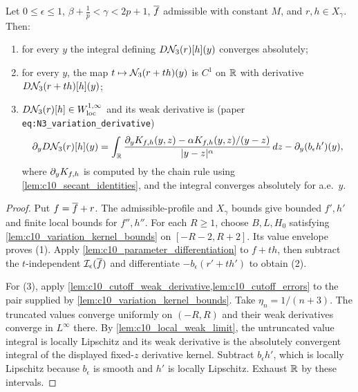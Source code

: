 \begin{lemma}
  \label{lem:c10_N3_variation}
  Let $0\le\epsilon\le1$, $\beta+\frac1p<\gamma<2p+1$, $\overline{f}$ admissible with constant $M$, and
  $r,h\in X_\gamma$. Then:
  \begin{enumerate}
    \item for every $y$ the integral defining $D\mathcal{N}_3(r)[h](y)$ converges absolutely;
    \item for every $y$, the map $t\mapsto\mathcal{N}_3(r+th)(y)$ is $C^1$ on $\mathbb{R}$ with derivative
      $D\mathcal{N}_3(r+th)[h](y)$;
    \item $D\mathcal{N}_3(r)[h]\in W^{1,\infty}_{\mathrm{loc}}$ and its weak derivative is (paper
      \texttt{eq:N3\_variation\_derivative})
      \[
        \partial_yD\mathcal{N}_3(r)[h](y)=\int_{\mathbb{R}}\frac{\partial_yK_{f,h}(y,z)-\alpha K_{f,h}(y,z)/(y-z)}{|y-z|^\alpha}\,dz-\partial_y(b_\epsilon h')(y),
      \]
      where $\partial_yK_{f,h}$ is computed by the chain rule using \cref{lem:c10_secant_identities}, and the
      integral converges absolutely for a.e.\ $y$.
  \end{enumerate}
\end{lemma}
\begin{proof}
  Put $f=\overline{f}+r$. The admissible-profile and $X_\gamma$ bounds give bounded $f',h'$ and finite
  local bounds for $f'',h''$. For each $R\ge1$, choose $B,L,H_0$ satisfying
  \cref{lem:c10_variation_kernel_bounds} on $[-R-2,R+2]$. Its value envelope proves (1).
  Apply \cref{lem:c10_parameter_differentiation} to $f+th$, then subtract the $t$-independent
  $\mathcal{I}_\epsilon(\overline{f})$ and differentiate $-b_\epsilon(r'+th')$ to obtain (2).

  For (3), apply \cref{lem:c10_cutoff_weak_derivative,lem:c10_cutoff_errors} to the pair supplied by
  \cref{lem:c10_variation_kernel_bounds}. Take $\eta_n=1/(n+3)$. The truncated values converge
  uniformly on $(-R,R)$ and their weak derivatives converge in $L^\infty$ there.
  By \cref{lem:c10_local_weak_limit}, the untruncated value integral is locally Lipschitz and its
  weak derivative is the absolutely convergent integral of the displayed fixed-$z$ derivative kernel.
  Subtract $b_\epsilon h'$, which is locally Lipschitz because $b_\epsilon$ is smooth and $h'$ is
  locally Lipschitz. Exhaust $\mathbb{R}$ by these intervals.
\end{proof}

